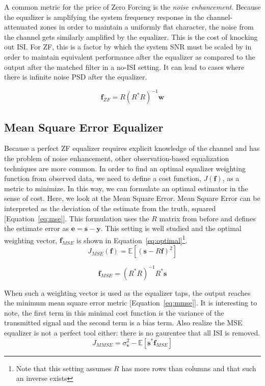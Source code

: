 \documentclass[]{article}
\begin{document}
A common metric for the price of Zero Forcing is the \emph{noise enhancement}.  Because the equalizer is amplifying the system frequency response in the channel-attenuated zones in order to maintain a uniformly flat character, the noise from the channel gets similarly amplified by the equalizer.  This is the cost of knocking out ISI.  For ZF, this is a factor by which the system SNR must be scaled by in order to maintain equivalent performance after the equalizer as compared to the output after the matched filter in a no-ISI setting.  It can lead to cases where there is infinite noise PSD after the equalizer.

\begin{equation}
\label{eq:zf} 
\mathbf{f}_{ZF} = R \left(R^{\ast}R \right)^{-1} \mathbf{w}
\end{equation}

\subsection{Mean Square Error Equalizer}
\label{sec:optimal}
Because a perfect ZF equalizer requires explicit knowledge of the channel and has the problem of noise enhancement, other observation-based equalization techniques are more common.  In order to find an optimal equalizer weighting function from observed data, we need to define a cost function, $J(\mathbf{f})$, as a metric to minimize.  In this way, we can formulate an optimal estimator in the sense of cost.  Here, we look at the Mean Square Error.  Mean Square Error can be interpreted as the deviation of the estimate from the truth, squared [Equation~\ref{eq:mse}].  This formulation uses the $R$ matrix from before and defines the estimate error as $\mathbf{e} = \mathbf{s} - \mathbf{y}$.  This setting is well studied and the optimal weighting vector, $\mathbf{f}_{MSE}$ is shown in Equation~\ref{eq:optimal}\footnote{Note that this setting assumes $R$ has more rows than columns and that such an inverse exists}.
\begin{equation}
\label{eq:mse} 
J_{MSE} \left( \mathbf{f}\right) = \mathbb{E} \left[ \left(\mathbf{s} - R \mathbf{f} \right)^2 \right]
\end{equation}

\begin{equation}
\label{eq:optimal}
\mathbf{f}_{MSE} = \left(R^{\ast}R\right)^{-1}R^{\ast}\mathbf{s}
\end{equation}

When such a weighting vector is used as the equalizer taps, the output reaches the minimum mean square error metric  [Equation~\ref{eq:mmse}].   It is interesting to note, the first term in this minimal cost function is the variance of the transmitted signal and the second term is a bias term.  Also realize the MSE equalizer is not a perfect tool either: there is no gaurentee that all ISI is removed.
\begin{equation}
\label{eq:mmse}
J_{MMSE} =  \sigma_{\mathbf{s}}^{2} - \mathbb{E} \left[ \mathbf{s}^{\ast} \mathbf{f}_{MSE} \right]
\end{equation}
\end{document}
